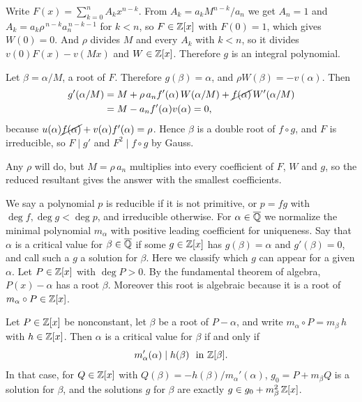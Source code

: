 \begin{pf}
  Write $F(x) = \sum_{k=0}^{n} A_{k}x^{n-k}$. From $A_{k} = a_{k}M^{n-k}/a_{n}$
  we get $A_{n} = 1$ and
  $A_{k} = a_{k}\rho^{\,n-k}a_{n}^{\,n-k-1}$ for $k < n$, so $F \in \mathbb{Z}[x]$ with
  $F(0) = 1$, which gives $W(0) = 0$. And $\rho$ divides $M$ and every $A_{k}$
  with $k < n$, so it divides $v(0)F(x) - v(Mx)$ and $W \in \mathbb{Z}[x]$. Therefore
  $g$ is an integral polynomial.

  Let $\beta = \alpha/M$, a root of $F$. Therefore $g(\beta) = \alpha$, and
  $\rho W(\beta) = -v(\alpha)$. Then
  \begin{align*}
    g'(\alpha/M)
      &= M + \rho\,a_{n}f'(\alpha)\,W(\alpha/M)
         + \cancel{f(\alpha)}\,W'(\alpha/M) \\
      &= M - a_{n}f'(\alpha)v(\alpha) = 0 ,
  \end{align*}
  because $u(\alpha)\cancel{f(\alpha)} + v(\alpha)f'(\alpha) = \rho$.
  Hence $\beta$ is a double root of $f \circ g$, and $F$ is irreducible, so
  $F \mid g'$ and $F^{2} \mid f \circ g$ by Gauss.
\end{pf}

Any $\rho$ will do, but $M = \rho\,a_{n}$ multiplies into every coefficient of
$F$, $W$ and $g$, so the reduced resultant gives the answer with the smallest
coefficients.

\label{Sclass}

We say a polynomial $p$ is reducible if it is not primitive, or $p = fg$
with $\deg f, \deg g < \deg p$, and irreducible otherwise. For
$\alpha \in \overline{\mathbb{Q}}$ we normalize the minimal polynomial $m_{\alpha}$
with positive leading coefficient for uniqueness.
Say that $\alpha$ is a critical value for $\beta \in \overline{\mathbb{Q}}$ if some
$g \in \mathbb{Z}[x]$ has $g(\beta) = \alpha$ and $g'(\beta) = 0$, and call such a $g$
a solution for $\beta$. Here we classify which $g$ can appear for a given
$\alpha$. Let $P \in \mathbb{Z}[x]$ with $\deg P > 0$. By the fundamental theorem
of algebra, $P(x) - \alpha$ has a root $\beta$. Moreover this root is
algebraic because it is a root of $m_{\alpha} \circ P \in \mathbb{Z}[x]$.

\begin{theorem}\label{Tcoset}
  Let $P \in \mathbb{Z}[x]$ be nonconstant, let $\beta$ be a root of $P - \alpha$,
  and write $m_{\alpha} \circ P = m_{\beta}\,h$ with $h \in \mathbb{Z}[x]$. Then
  $\alpha$ is a critical value for $\beta$ if and only if
  \[
    m_{\alpha}'(\alpha) \mid h(\beta) \ \text{ in } \mathbb{Z}[\beta] .
  \]
  In that case,
  for $Q \in \mathbb{Z}[x]$ with $Q(\beta) = -h(\beta)/m_{\alpha}'(\alpha)$,
  $g_{0} = P + m_{\beta}Q$ is a solution for $\beta$, and the solutions $g$
  for $\beta$ are exactly $g \in g_{0} + m_{\beta}^{2}\,\mathbb{Z}[x]$.
\end{theorem}

